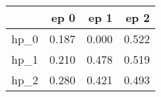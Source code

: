 \begin{tabular}{lrrr}
\toprule
{} &   ep 0 &   ep 1 &   ep 2 \\
\midrule
hp\_0 &  0.187 &  0.000 &  0.522 \\
hp\_1 &  0.210 &  0.478 &  0.519 \\
hp\_2 &  0.280 &  0.421 &  0.493 \\
\bottomrule
\end{tabular}
